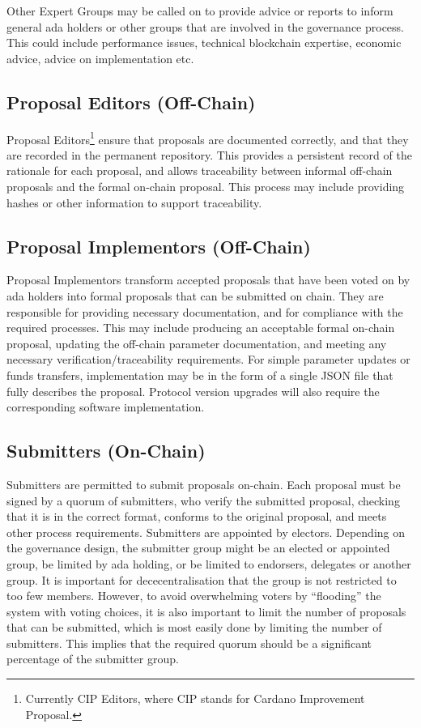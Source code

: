 Other Expert Groups may be called on to provide advice or reports to inform general ada holders or other groups that are involved in the
governance process.  This could include performance issues, technical blockchain expertise, economic advice, advice on implementation etc.

\subsection{Proposal Editors (Off-Chain)}

Proposal Editors\footnote{Currently CIP Editors, where CIP stands for Cardano Improvement Proposal.} ensure that proposals are documented correctly, and that they are recorded in the
permanent repository.
This provides a persistent record of the rationale for each proposal, and allows traceability between informal off-chain
proposals and the formal on-chain proposal.  This process may include providing hashes or other information to support traceability.

\subsection{Proposal Implementors (Off-Chain)}

Proposal Implementors transform accepted proposals that have been voted on by ada holders into formal proposals that can be submitted on chain.
They are responsible for providing necessary documentation, and for compliance with the required processes.  This may include producing an acceptable formal on-chain proposal,
updating the off-chain parameter documentation,
and meeting any necessary verification/traceability requirements.  For simple parameter updates or funds transfers, implementation may be in the form of a single JSON
file that fully describes the proposal. Protocol version upgrades will also require the corresponding software implementation.

\subsection{Submitters (On-Chain)}

Submitters are permitted to submit proposals on-chain.  Each proposal must be signed by a quorum of submitters, who verify the submitted
proposal, checking that it is in the correct format, conforms to the original proposal, and meets other process requirements.
Submitters are appointed by electors.  Depending on the governance design, the submitter group might %
be an elected or appointed group, be limited by ada holding, or be limited to endorsers, delegates or another group.
It is important for dececentralisation that the group is not restricted to too few members.
However, to avoid overwhelming voters by ``flooding'' the system with voting choices, it is also important to limit the number of proposals that can
be submitted, which is most easily done by limiting the number of submitters.  This implies that the required quorum should be a significant percentage
of the submitter group.

